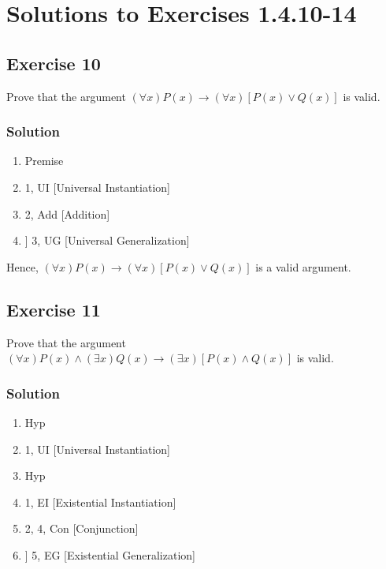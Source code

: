 \documentclass[12pt]{article}
\begin{document}
\section*{Solutions to Exercises 1.4.10-14}

\subsection*{Exercise 10}
Prove that the argument \( (\forall x)P(x) \rightarrow (\forall x)[P(x)\lor Q(x)] \) is valid.

\subsubsection*{Solution}
\begin{enumerate}[left=0em,labelwidth=4em,align=left]
    \item[\( (\forall x)P(x) \)] \hfill Premise
    \item[\( P(a) \)] \hfill 1, UI [Universal Instantiation]
    \item[\( P(a) \lor Q(a) \)] \hfill 2, Add [Addition]
    \item[\( (\forall x)[P(x) \lor Q(x)] \)] \hfill 3, UG [Universal Generalization]
\end{enumerate}
Hence, \( (\forall x)P(x) \rightarrow (\forall x)[P(x)\lor Q(x)] \) is a valid argument.

\subsection*{Exercise 11}
Prove that the argument \( (\forall x)P(x)\land (\exists x)Q(x)\rightarrow (\exists x)[P(x)\land Q(x)] \) is valid.

\subsubsection*{Solution}
\begin{enumerate}[left=0em,labelwidth=4em,align=left]
    \item[\( (\forall x)P(x)\land (\exists x)Q(x) \)] \hfill Hyp
    \item[\( P(a) \)] \hfill 1, UI [Universal Instantiation]
    \item[\( (\exists x)Q(x) \)] \hfill Hyp
    \item[\( Q(b) \)] \hfill 1, EI [Existential Instantiation]
    \item[\( P(a) \land Q(b) \)] \hfill 2, 4, Con [Conjunction]
    \item[\( (\exists x)[P(x) \land Q(x)] \)] \hfill 5, EG [Existential Generalization]
\end{enumerate}
\end{document}
